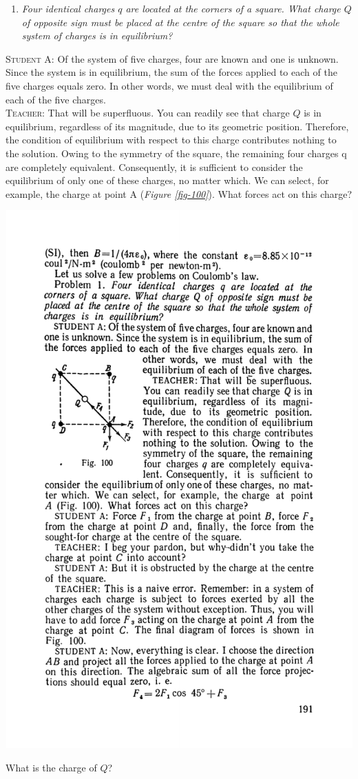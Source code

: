 \documentclass[a4paper,sfsidenotes]{tufte-book}
\begin{document}
\begin{enumerate}[label=Problem \arabic*.,font=\bfseries,series=p3,leftmargin=*]
\item \emph{Four identical charges $q$ are located at the corners of a square. What charge $Q$ of opposite sign must be placed at the centre of the square so that the whole system of charges is in equilibrium?}
\end{enumerate}
\textsc{Student A:} Of the system of five charges, four are known and one is unknown. Since the system is in equilibrium, the sum of the forces applied to each of the five charges equals zero. In other words, we must deal with the equilibrium of each of the five charges.
\\
\textsc{Teacher:} That will be superfluous. You can readily see that charge $Q$ is in equilibrium, regardless of its magnitude, due to its geometric position. Therefore, the condition of equilibrium with respect to this charge contributes nothing to the solution. Owing to the symmetry of the square, the remaining four charges q are completely equivalent. Consequently, it is sufficient to consider the equilibrium of only one of these charges, no matter which. We can select, for example, the charge at point A (\emph{Figure \ref{fig-100}}). What forces act on this charge?
\begin{marginfigure}%
\centering
\includegraphics[width=.8\linewidth]{fig-100a}
\caption{What is the charge of $Q$?}
\label{fig-100}
\end{marginfigure}
\end{document}
